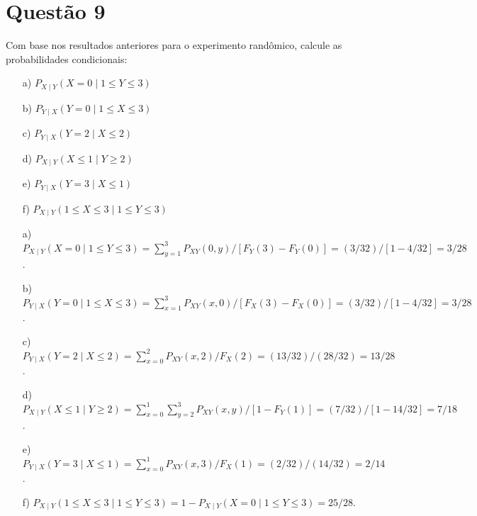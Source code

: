 \section{Questão 9}

Com base nos resultados anteriores para o experimento randômico, calcule as probabilidades condicionais:

\begin{multicols}{2}
\begin{itemize}
    \item [a)] $P_{X\mid Y} (X=0\mid 1\leq Y\leq 3)$
    \item [b)] $P_{Y\mid X} (Y=0\mid 1\leq X\leq 3)$
    \item [c)] $P_{Y\mid X} (Y=2\mid X\leq 2)$
    \item [d)] $P_{X\mid Y} (X\leq 1\mid Y\geq 2)$
    \item [e)] $P_{Y\mid X} (Y=3\mid X\leq 1)$
    \item [f)] $P_{X\mid Y} (1\leq X\leq 3 \mid 1\leq Y\leq 3)$
\end{itemize}
\end{multicols}

\begin{respostas}

\begin{itemize}
    \item [a)] 
    $P_{X\mid Y} (X=0\mid 1\leq Y\leq 3)
    = \sum_{y=1}^3 P_{XY}(0, y) / [F_Y(3) - F_Y(0)]
    = (3/32) / [1 - 4/32]
    = 3/28$.
    
    \item [b)] 
    $P_{Y\mid X} (Y=0\mid 1\leq X\leq 3)
    = \sum_{x=1}^3 P_{XY}(x, 0) / [F_X(3) - F_X(0)]
    = (3/32) / [1 - 4/32]
    = 3/28$.
    
    \item [c)] 
    $P_{Y\mid X} (Y=2\mid X\leq 2)
    = \sum_{x=0}^2 P_{XY}(x, 2) / F_X(2)
    = (13/32) / (28/32)
    = 13/28$.
    
    \item [d)] 
    $P_{X\mid Y} (X\leq 1\mid Y\geq 2)
    = \sum_{x=0}^1\sum_{y=2}^3 P_{XY}(x, y) / [1-F_Y(1)]
    = (7/32) / [1 - 14/32]
    = 7/18$.
    
    \item [e)] 
    $P_{Y\mid X} (Y=3\mid X\leq 1)
    = \sum_{x=0}^1 P_{XY}(x, 3) / F_X(1)
    = (2/32) / (14/32)
    = 2/14$.
    
    \item [f)] 
    $P_{X\mid Y} (1\leq X\leq 3\mid 1\leq Y\leq 3)
    = 1 - P_{X\mid Y} (X=0\mid 1\leq Y\leq 3)
    = 25/28$.
\end{itemize}

\end{respostas}